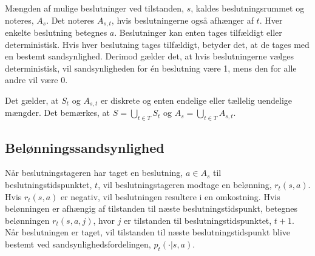 Mængden af mulige beslutninger ved tilstanden, $s$, kaldes beslutningsrummet og noteres, $A_s$. Det noteres $A_{s,t}$, hvis beslutningerne også afhænger af $t$. Hver enkelte beslutning betegnes $a$. Beslutninger kan enten tages tilfældigt eller deterministisk. Hvis hver beslutning tages tilfældigt, betyder det, at de tages med en bestemt sandsynlighed. Derimod gælder det, at hvis beslutningerne vælges deterministisk, vil sandsynligheden for én beslutning være 1, mens den for alle andre vil være 0.

Det gælder, at $S_t$ og $A_{s,t}$ er diskrete og enten endelige eller tællelig uendelige mængder. Det bemærkes, at $S=\displaystyle \bigcup_{t\in T}S_t$ og $A_s=\displaystyle\bigcup_{t\in T}A_{s,t}$.



\subsection{Belønningssandsynlighed}
Når beslutningstageren har taget en beslutning, $a\in A_{s}$ til beslutningstidspunktet, $t$, vil beslutningstageren modtage en belønning, $r_t(s,a)$. Hvis $r_t(s,a)$ er negativ, vil beslutningen resultere i en omkostning. Hvis belønningen er afhængig af tilstanden til næste beslutningstidspunkt, betegnes belønningen $r_t(s, a, j)$, hvor $j$ er tilstanden til beslutningstidspunktet, $t+1$.
Når beslutningen er taget, vil tilstanden til næste beslutningstidspunkt blive bestemt ved sandsynlighedsfordelingen, $p_t(\cdot|s,a)$. 




